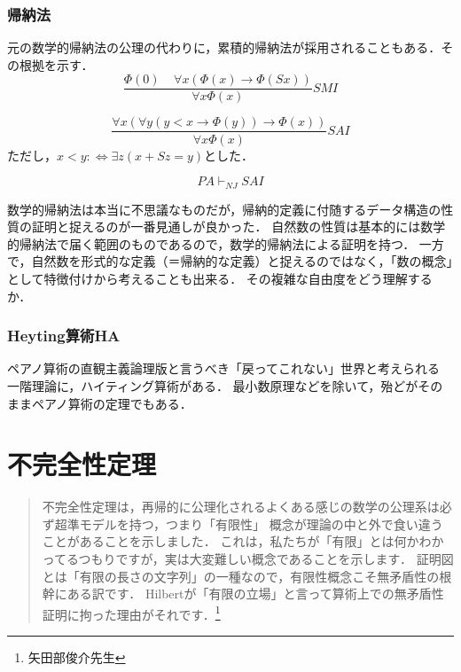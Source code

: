 \documentclass[uplatex, 12pt, dvipdfmx]{jsreport}
\begin{document}
\subsection{帰納法}

元の数学的帰納法の公理の代わりに，累積的帰納法が採用されることもある．その根拠を示す．
\[\frac{\Phi(0)\;\;\;\;\forall x(\Phi(x)\to\Phi(Sx))}{\forall x\Phi(x)}SMI\]

\begin{definition}
    \[\frac{\forall x(\forall y(y<x\to\Phi(y))\to\Phi(x))}{\forall x\Phi(x)}SAI\]
    ただし，$x<y:\Leftrightarrow\exists z(x+Sz=y)$とした．
\end{definition}

\begin{proposition}[累積的帰納法]
    \[PA\vdash_{NJ}SAI\]
\end{proposition}

\begin{screen}
    数学的帰納法は本当に不思議なものだが，帰納的定義に付随するデータ構造の性質の証明と捉えるのが一番見通しが良かった．
    自然数の性質は基本的には数学的帰納法で届く範囲のものであるので，数学的帰納法による証明を持つ．
    一方で，自然数を形式的な定義（＝帰納的な定義）と捉えるのではなく，「数の概念」として特徴付けから考えることも出来る．
    その複雑な自由度をどう理解するか．
\end{screen}

\subsection{Heyting算術HA}
ペアノ算術の直観主義論理版と言うべき「戻ってこれない」世界と考えられる
一階理論に，ハイティング算術がある．
最小数原理などを除いて，殆どがそのままペアノ算術の定理でもある．

\chapter{不完全性定理}

\begin{quote}
    不完全性定理は，再帰的に公理化されるよくある感じの数学の公理系は必ず超準モデルを持つ，つまり「有限性」
    概念が理論の中と外で食い違うことがあることを示しました．
    これは，私たちが「有限」とは何かわかってるつもりですが，実は大変難しい概念であることを示します．
    証明図とは「有限の長さの文字列」の一種なので，有限性概念こそ無矛盾性の根幹にある訳です．
    Hilbertが「有限の立場」と言って算術上での無矛盾性証明に拘った理由がそれです．\footnote{矢田部俊介先生}
\end{quote}
\end{document}
